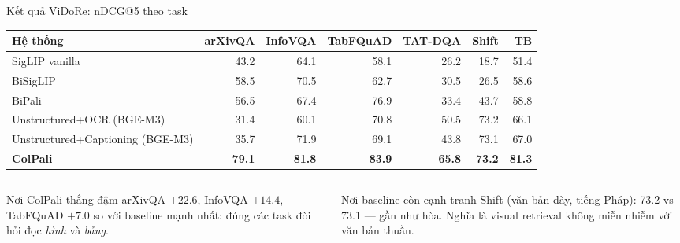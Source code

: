 \documentclass[aspectratio=169,10pt]{beamer}
\newcommand{\good}[1]{\textcolor{mathgreen}{\textbf{#1}}}
\begin{document}
\begin{frame}{Kết quả ViDoRe: nDCG@5 theo task}
  \centering
  \scriptsize
  \setlength{\tabcolsep}{3.2pt}
  \begin{tabular}{@{}lrrrrrr@{}}
    \toprule
    Hệ thống & arXivQA & InfoVQA & TabFQuAD & TAT-DQA & Shift & \textbf{TB} \\
    \midrule
    SigLIP vanilla        & 43.2 & 64.1 & 58.1 & 26.2 & 18.7 & 51.4 \\
    BiSigLIP              & 58.5 & 70.5 & 62.7 & 30.5 & 26.5 & 58.6 \\
    BiPali                & 56.5 & 67.4 & 76.9 & 33.4 & 43.7 & 58.8 \\
    Unstructured+OCR (BGE-M3)      & 31.4 & 60.1 & 70.8 & 50.5 & 73.2 & 66.1 \\
    Unstructured+Captioning (BGE-M3) & 35.7 & 71.9 & 69.1 & 43.8 & 73.1 & 67.0 \\
    \midrule
    \textbf{ColPali}      & \good{79.1} & \good{81.8} & \good{83.9} & \good{65.8} & \good{73.2} & \good{81.3} \\
    \bottomrule
  \end{tabular}

  \vspace{4mm}
  \begin{columns}[T]
    \begin{column}{0.48\textwidth}
      \begin{block}{\small Nơi ColPali thắng đậm}
        \footnotesize
        arXivQA $+22.6$, InfoVQA $+14.4$, TabFQuAD $+7.0$ so với baseline mạnh nhất:
        đúng các task đòi hỏi đọc \emph{hình} và \emph{bảng}.
      \end{block}
    \end{column}
    \begin{column}{0.48\textwidth}
      \begin{block}{\small Nơi baseline còn cạnh tranh}
        \footnotesize
        Shift (văn bản dày, tiếng Pháp): 73.2 vs 73.1 --- gần như hòa.
        Nghĩa là visual retrieval không miễn nhiễm với văn bản thuần.
      \end{block}
    \end{column}
  \end{columns}
\end{frame}
\end{document}
